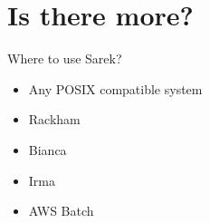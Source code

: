 \documentclass{beamer}
\begin{document}
\section{Is there more?}

\begin{frame}{Where to use Sarek?}
	\begin{center}
	\end{center}
	\begin{itemize}
		\item<1> Any POSIX compatible system
		\pause
		\item<-4> Rackham
		\pause
		\item<-4> Bianca
		\pause
		\item<-4> Irma
		\item<5> AWS Batch
	\end{itemize}
\end{frame}
\end{document}
